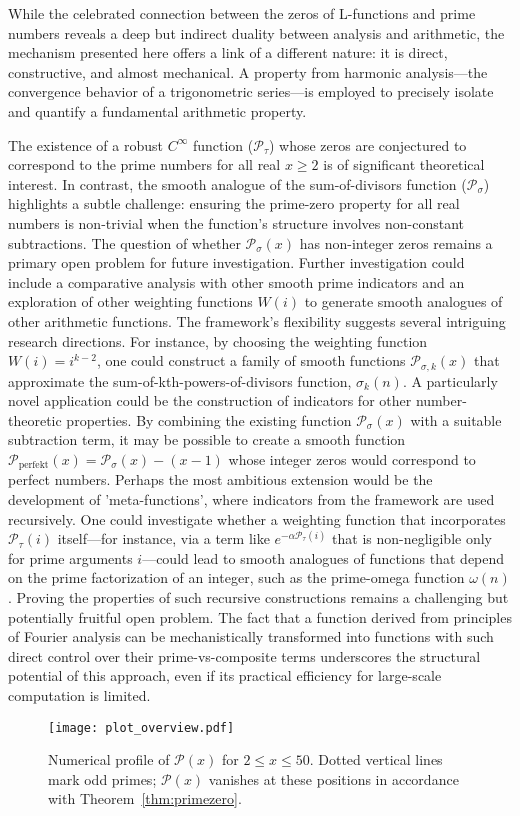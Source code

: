 \documentclass[11pt,a4paper]{amsart}
\newcommand{\Px}{\mathcal{P}}
\theoremstyle{plain}
\theoremstyle{definition}
\begin{document}
While the celebrated connection between the zeros of L-functions and prime numbers reveals a deep but indirect duality between analysis and arithmetic, the mechanism presented here offers a link of a different nature: it is direct, constructive, and almost mechanical. A property from harmonic analysis—the convergence behavior of a trigonometric series—is employed to precisely isolate and quantify a fundamental arithmetic property.

The existence of a robust $C^\infty$ function ($\Px_{\tau}$) whose zeros are conjectured to correspond to the prime numbers for all real $x \ge 2$ is of significant theoretical interest.  In contrast, the smooth analogue of the sum-of-divisors function ($\Px_{\sigma}$) highlights a subtle challenge: ensuring the prime-zero property for all real numbers is non-trivial when the function's structure involves non-constant subtractions.  The question of whether $\Px_{\sigma}(x)$ has non-integer zeros remains a primary open problem for future investigation.  Further investigation could include a comparative analysis with other smooth prime indicators and an exploration of other weighting functions $W(i)$ to generate smooth analogues of other arithmetic functions.  The framework's flexibility suggests several intriguing research directions. For instance, by choosing the weighting function $W(i) = i^{k-2}$, one could construct a family of smooth functions $\mathcal{P}_{\sigma,k}(x)$ that approximate the sum-of-kth-powers-of-divisors function, $\sigma_k(n)$.  A particularly novel application could be the construction of indicators for other number-theoretic properties.  By combining the existing function $\mathcal{P}_{\sigma}(x)$ with a suitable subtraction term, it may be possible to create a smooth function $\mathcal{P}_{\text{perfekt}}(x) = \mathcal{P}_{\sigma}(x) - (x-1)$ whose integer zeros would correspond to perfect numbers.  Perhaps the most ambitious extension would be the development of 'meta-functions', where indicators from the framework are used recursively.  One could investigate whether a weighting function that incorporates $\mathcal{P}_{\tau}(i)$ itself—for instance, via a term like $e^{-\alpha \mathcal{P}_{\tau}(i)}$ that is non-negligible only for prime arguments $i$—could lead to smooth analogues of functions that depend on the prime factorization of an integer, such as the prime-omega function $\omega(n)$.  Proving the properties of such recursive constructions remains a challenging but potentially fruitful open problem.  The fact that a function derived from principles of Fourier analysis can be mechanistically transformed into functions with such direct control over their prime-vs-composite terms underscores the structural potential of this approach, even if its practical efficiency for large-scale computation is limited.
\begin{figure}[!htbp]
\centering
\texttt{[image: plot\_overview.pdf]}
\caption{Numerical profile of $\Px(x)$ for $2\le x\le 50$. Dotted vertical lines mark odd primes;
$\Px(x)$ vanishes at these positions in accordance with Theorem~\ref{thm:primezero}.}
\label{fig:overview}
\end{figure}
\end{document}

